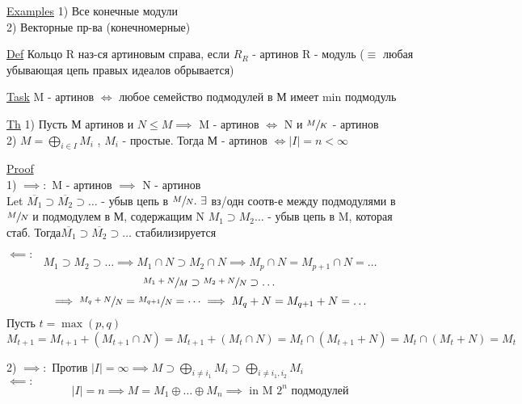 \documentclass[a4paper]{article}
\begin{document}
\underline{Examples} 1) Все конечные модули\\
2) Векторные пр-ва (конечномерные)

\begin{tcolorbox}
\underline{Def} Кольцо R наз-ся артиновым справа, если $ R_R $ - артинов R - модуль
($ \equiv $ любая убывающая цепь правых идеалов обрывается)
\end{tcolorbox}

\underline{Task} M - артинов $ \iff $ любое семейство подмодулей в М имеет min 
подмодуль

\begin{tcolorbox}
\underline{Th} 1) Пусть М артинов и $ N \leq M \implies $ M - артинов $ \iff $ 
N и $ \sfrac{M}{K} $ - артинов\\
2) $ M = \bigoplus_{i \in I} M_i $ , $ M_i $ - простые. Тогда М - артинов $ \iff
|I| = n < \infty$ 

\underline{Proof}\\
1) $ \implies: $ M - артинов $ \implies $ N - артинов\\
Let $ \overline{M_1} \supset \overline{M_2} \supset \dots $ - убыв цепь в $ 
\sfrac{M}{N}. \ \exists $ вз/одн соотв-е между подмодулями в $ \sfrac{M}{N} $ и
подмодулем в М, содержащим N $ M_1 \supset M_2 \dots $ - убыв цепь в M, которая стаб.
Тогда$ \overline{M_1} \supset \overline{M_2} \supset \dots $ стабилизируется

$ \impliedby: $ 
\[
    M_1 \supset M_2 \supset \dots \implies M_1 \cap N \supset M_2 \cap N \implies
    M_p \cap N = M_{p+1} \cap N = \dots
\]
\[
    \sfrac{M_1 + N}{M}\supset \sfrac{M_2 + N}{N} \supset \dots
\]
\[
    \implies \sfrac{M_q + N}{N} = \sfrac{M_{q + 1}}{N} = \dots \implies
    M_q + N = M_{q+1} + N = \dots
\]
Пусть $ t = \max(p,q) $ 
\[
    M_{t+1} = M_{t+1} + (M_{t+1} \cap N) = M_{t+1} + (M_t \cap N) = M_t \cap 
    (M_{t+1} + N) = M_t \cap (M_t + N) = M_t
\]

2) $ \implies: $ Против $ |I| = \infty \implies M \supset \bigoplus_{i \neq i_1} M_i
\supset \bigoplus_{i \neq i_1, i_2} M_i$ \\
$ \impliedby: $ 
\[
    |I| = n \implies M = M_1 \oplus \dots \oplus M_n \implies \text{ in M }  
    2^{n} \text{ подмодулей}
\]
\end{tcolorbox}
\end{document}
